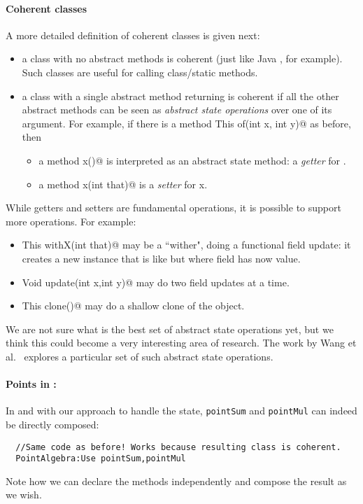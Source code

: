\paragraph{Coherent classes} A more detailed definition of coherent
classes is given next:
\begin{itemize}
\item a class with no abstract methods is coherent (just like Java
  \Q@Math@, for example). Such classes are useful for calling class/static methods.
\item a class with a single abstract \Q@static@ method returning \Q@This@
is coherent if all the other abstract methods can be seen as \emph{abstract state
operations} over one of its argument.
For example,
if there is a \Q@static method This of(int x, int y)@ as before,
then
\begin{itemize}
\item a method \Q@int x()@ is interpreted as an abstract state method: a \emph{getter} for \Q@x@.
\item a method \Q@Void x(int that)@ is a \emph{setter} for x.
\end{itemize}
\end{itemize}
\noindent
While getters and setters are fundamental operations, it is possible to
support more operations. For example:
\begin{itemize}
\item \Q@method This withX(int that)@
may be a ``wither", doing a functional field update: it creates a new instance that is like \Q@this@ but where field \Q@x@ has now \Q@that@ value.
\item \Q@method Void update(int x,int y)@
may do two field updates at a time.
\item\Q@method This clone()@ may do a shallow clone of the object.
\end{itemize}

We are not sure what is the best set of abstract state operations yet,
but we think this could become a very interesting area of research.
The work by Wang et al.~\cite{wang2016classless} explores a particular
set of such abstract state operations.

\paragraph{Points in \name:}
In \name and with our approach to handle the state, 
\lstinline{pointSum} and \lstinline{pointMul} can indeed be directly composed:
\saveSpace
\begin{lstlisting}
  //Same code as before! Works because resulting class is coherent.
  PointAlgebra:Use pointSum,pointMul 
\end{lstlisting}  
\saveSpace
\noindent
  Note how we can declare the methods independently and compose the result
  as we wish. 

